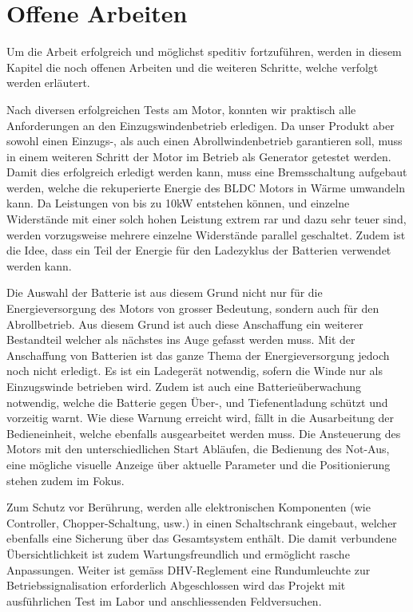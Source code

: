 \section{Offene Arbeiten}
Um die Arbeit erfolgreich und möglichst speditiv fortzuführen, werden in diesem Kapitel die noch offenen Arbeiten und die weiteren Schritte, welche verfolgt werden erläutert.

Nach diversen erfolgreichen Tests am Motor, konnten wir praktisch alle Anforderungen an den Einzugswindenbetrieb erledigen. Da unser Produkt aber sowohl einen Einzugs-, als auch einen Abrollwindenbetrieb garantieren soll, muss in einem weiteren Schritt der Motor im Betrieb als Generator getestet werden. Damit dies erfolgreich erledigt werden kann, muss eine Bremsschaltung aufgebaut werden, welche die rekuperierte Energie des BLDC Motors in Wärme umwandeln kann. Da Leistungen von bis zu 10kW entstehen können, und einzelne Widerstände mit einer solch hohen Leistung extrem rar und dazu sehr teuer sind, werden vorzugsweise mehrere einzelne Widerstände parallel geschaltet. Zudem ist die Idee, dass ein Teil der Energie für den Ladezyklus der Batterien verwendet werden kann.

Die Auswahl der Batterie ist aus diesem Grund nicht nur für die Energieversorgung des Motors von grosser Bedeutung, sondern auch für den Abrollbetrieb. Aus diesem Grund ist auch diese Anschaffung ein weiterer Bestandteil welcher als nächstes ins Auge gefasst werden muss. Mit der Anschaffung von Batterien ist das ganze Thema der Energieversorgung jedoch noch nicht erledigt. Es ist ein Ladegerät notwendig, sofern die Winde nur als Einzugswinde betrieben wird. Zudem ist auch eine Batterieüberwachung notwendig, welche die Batterie gegen Über-, und Tiefenentladung schützt und vorzeitig warnt. Wie diese Warnung erreicht wird, fällt in die Ausarbeitung der Bedieneinheit, welche ebenfalls ausgearbeitet werden muss. Die Ansteuerung des Motors mit den unterschiedlichen Start Abläufen, die Bedienung des Not-Aus, eine mögliche visuelle Anzeige über aktuelle Parameter und die Positionierung stehen zudem im Fokus.

Zum Schutz vor Berührung, werden alle elektronischen Komponenten (wie Controller, Chopper-Schaltung, usw.) in einen Schaltschrank eingebaut, welcher ebenfalls eine Sicherung über das Gesamtsystem enthält. Die damit verbundene Übersichtlichkeit ist zudem Wartungsfreundlich und ermöglicht rasche Anpassungen. Weiter ist gemäss DHV-Reglement eine Rundumleuchte zur Betriebssignalisation erforderlich 
Abgeschlossen wird das Projekt mit ausführlichen Test im Labor und anschliessenden Feldversuchen.